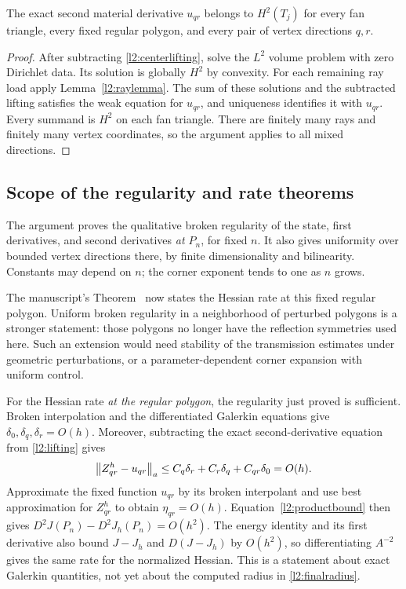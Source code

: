 \begin{proposition}
\label{l2:secondproposition}
The exact second material derivative $u_{qr}$ belongs to $H^2(T_j)$ for every
fan triangle, every fixed regular polygon, and every pair of vertex
directions $q,r$.
\end{proposition}
\begin{proof}
After subtracting \eqref{l2:centerlifting}, solve the $L^2$ volume problem
with zero Dirichlet data. Its solution is globally $H^2$ by convexity.
For each remaining ray load apply Lemma~\ref{l2:raylemma}. The sum of
these solutions and the subtracted lifting satisfies the weak equation
for $u_{qr}$, and uniqueness identifies it with $u_{qr}$. Every summand
is $H^2$ on each fan triangle. There are finitely many rays and finitely
many vertex coordinates, so the argument applies to all mixed directions.
\end{proof}

\subsection{Scope of the regularity and rate theorems}
The argument proves the qualitative broken regularity of the state,
first derivatives, and second derivatives \emph{at $P_n$}, for fixed $n$.
It also gives uniformity over bounded vertex directions there, by finite
dimensionality and bilinearity. Constants may depend on $n$; the corner
exponent tends to one as $n$ grows.

The manuscript's Theorem~ now states the Hessian rate at
this fixed regular polygon. Uniform broken regularity in a neighborhood
of perturbed polygons is a stronger statement: those polygons no longer
have the reflection symmetries used here. Such an extension would need
stability of the transmission estimates under geometric perturbations,
or a parameter-dependent corner expansion with uniform control.

For the Hessian rate \emph{at the regular polygon}, the regularity just
proved is sufficient. Broken interpolation and the differentiated
Galerkin equations give $\delta_0,\delta_q,\delta_r=O(h)$. Moreover,
subtracting the exact second-derivative equation from \eqref{l2:lifting}
gives
\[
 \left\|Z_{qr}^h-u_{qr}\right\|_a
 \leq C_q\delta_r+C_r\delta_q+C_{qr}\delta_0=O(h).
\]
Approximate the fixed function $u_{qr}$ by its broken interpolant and use
best approximation for $Z_{qr}^h$ to obtain $\eta_{qr}=O(h)$.
Equation~\eqref{l2:productbound} then gives
$D^2J(P_n)-D^2J_h(P_n)=O(h^2)$.
The energy identity and its first derivative also bound $J-J_h$ and
$D(J-J_h)$ by $O(h^2)$, so differentiating $A^{-2}$ gives the same rate
for the normalized Hessian. This is a statement about exact Galerkin
quantities, not yet about the computed radius in \eqref{l2:finalradius}.

